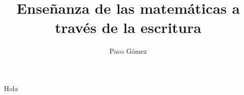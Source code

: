 \documentclass[12pt]{article}
\title{Enseñanza de las matemáticas a través de la escritura}
\author{Paco Gómez}
\begin{document}
Hola
\end{document}
